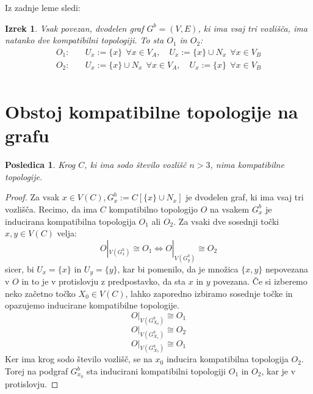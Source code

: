 \documentclass[a4paper, 12pt]{book}
\newtheorem{theorem}{Izrek}[section]
\newtheorem{corollary}{Posledica}[section]
\theoremstyle{definition}
\begin{document}
Iz zadnje leme sledi:
\begin{theorem}
Vsak povezan, dvodelen graf $G^b = (V,E)$, ki ima vsaj tri vozlišča, ima natanko
dve kompatibilni topologiji. To sta $O_1$ in $O_2$:
\[
  \begin{split}
  O_1:&\quad
  U_x:=\{x\}\ \ \forall x \in V_A, \quad
  U_x:=\{x\}\cup N_x\ \  \forall x \in V_B\\
  O_2:&\quad
  U_x:=\{x\}\cup N_x\ \  \forall x \in V_A, \quad
  U_x:=\{x\}\ \ \forall x \in V_B\\
\end{split}
\]
\end{theorem}

\section{Obstoj kompatibilne topologije na grafu} \label{obstoj}

\begin{corollary}\label{corollary1}
Krog $C$, ki ima sodo število vozlišč $n > 3$, nima kompatibilne topologije.
\end{corollary}
\begin{proof}
Za vsak $x \in V(C), G_x^b := C[\{x\} \cup N_x]$ je dvodelen graf, ki ima vsaj tri
vozlišča. Recimo, da ima $C$ kompatibilno topologijo $O$ na vsakem $G_x^b$ je inducirana 
kompatibilna topologija $O_1$ ali $O_2$. Za vsaki dve sosednji točki $x,y \in V(C)$ velja:
\[
    O|_{V(G_x^b)} \cong O_1 \iff O|_{V(G_y^b)} \cong O_2
\]
sicer, bi $U_x = \{x\}$ in $U_y = \{y\}$, kar bi pomenilo, da je množica
$\{x, y\}$ nepovezana v $O$ in to je v protislovju z predpostavko, da sta $x$ in
$y$ povezana. Če si izberemo neko začetno točko $X_0 \in V(C)$, lahko zaporedno
izbiramo sosednje točke in opazujemo inducirane kompatibilne topologije.
\[O|_{V(G_{X_0}^b)} \cong O_1\]
\[O|_{V(G_{X_1}^b)} \cong O_2\]
\[O|_{V(G_{X_3}^b)} \cong O_1\]
Ker ima krog sodo število vozlišč, se na $x_0$ inducira kompatibilna topologija $O_2$. Torej
na podgraf $G^b_{x_0}$ sta inducirani kompatibilni topologiji $O_1$ in $O_2$, kar je v protislovju.
\end{proof}
\end{document}
